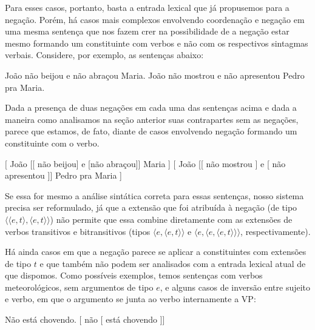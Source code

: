 \n Para esses casos, portanto, basta a entrada lexical que já
propusemos para a nega\-ção. Porém, há casos mais complexos
envolvendo coordena\-ção e nega\-ção em uma mesma senten\-ça que
nos fazem crer na possibilidade de a nega\-ção estar mesmo
formando um constituinte com verbos e não com os respectivos
sintagmas verbais. Considere, por exemplo, as senten\-ças abaixo:

\begin{exe}
\ex\label{trw}
\begin{xlist}
\ex João não beijou e não abraçou Maria.\label{trwa}
\ex João não mostrou e não apresentou Pedro pra Maria.\label{trwb}
\end{xlist}
\end{exe}

\n Dada a presen\-ça de duas nega\-çõ\-es em cada uma das
senten\-ças acima e dada a maneira como analisamos na se\-ção
anterior suas contrapartes sem as nega\-çõ\-es, parece que estamos,
de fato, diante de casos envolvendo  nega\-ção formando um
constituinte com o verbo.

\begin{exe}
\ex\label{arg}
\begin{xlist}
\ex $[$ João [[ não beijou] e [não abraçou]] Maria ]\label{arga}
\ex $[$ João [[ não mostrou ] e [ não apresentou ]] Pedro pra Maria ]\label{argb}
\end{xlist}
\end{exe}

\n Se essa for mesmo a análise sintática correta para essas
senten\-ças, nosso sistema precisa ser reformulado, já que a
extensão que foi atribuída à nega\-ção (de tipo $\langle\langle
e,t\rangle,\langle e,t\rangle\rangle$) não permite que essa
combine diretamente com as extensões de verbos transitivos e
bitransitivos (tipos $\langle e,\langle e,t\rangle\rangle$ e
$\langle e,\langle e,\langle e,t\rangle\rangle\rangle$,
respectivamente).

Há ainda casos em que a negação parece se aplicar a constituintes com extensões de tipo $t$ e que também não podem ser analisados com a entrada lexical atual de que dispomos. Como possíveis exemplos, temos sentenças com verbos meteorológicos, sem argumentos de tipo $e$, e alguns casos de inversão entre sujeito e verbo, em que o argumento se junta ao verbo internamente a VP:

\begin{exe}
\ex\label{jjj}
\begin{xlist}
\ex Não está chovendo.\label{jjja}
\ex $[$ não [ está chovendo ]]\label{jjjb}
\end{xlist}
\end{exe}

